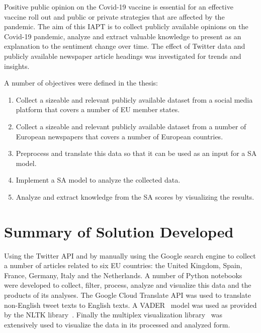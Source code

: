Positive public opinion on the Covid-19 vaccine is essential for an effective vaccine roll out and public or private strategies that are affected by the pandemic.
The aim of this \ac{IAPT} is to collect publicly available opinions on the Covid-19 pandemic, analyze and extract valuable knowledge to present as an explanation to the sentiment change over time.
The effect of Twitter data and publicly available newspaper article headings was investigated for trends and insights.

\noindent A number of objectives were defined in the thesis:

\begin{enumerate}
  \item Collect a sizeable and relevant publicly available dataset from a social media platform that covers a number of \ac{EU} member states.
  \item Collect a sizeable and relevant publicly available dataset from a number of European newspapers that covers a number of European countries.
  \item Preprocess and translate this data so that it can be used as an input for a \ac{SA} model.
  \item Implement a \ac{SA} model to analyze the collected data.
  \item Analyze and extract knowledge from the \ac{SA} scores by visualizing the results.
\end{enumerate}

\section{Summary of Solution Developed}

Using the Twitter \ac{API} and by manually using the Google search engine to collect a number of articles related to six \ac{EU} countries: the United Kingdom, Spain, France, Germany, Italy and the Netherlands.
A number of Python notebooks were developed to collect, filter, process, analyze and visualize this data and the products of its analyses.
The Google Cloud Translate \ac{API} was used to translate non-English tweet texts to English texts.
A \ac{VADER}~\citep{Hutto_Gilbert_2014} model was used as provided by the \ac{NLTK} library~\citep{bird2009natural}.
Finally the multiplex visualization library~\citep{Mamo2021} was extensively used to visualize the data in its processed and analyzed form.


%


